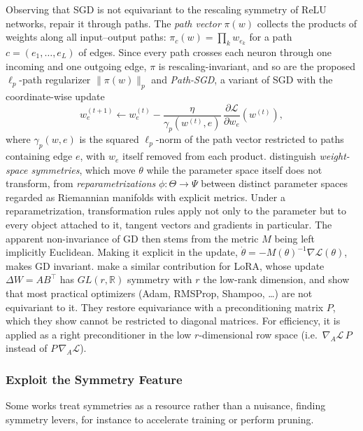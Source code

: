 \documentclass[mathematics,review,submit,moreauthors]{Definitions/mdpi}
\begin{document}
Observing that SGD is not equivariant to the rescaling symmetry of ReLU networks, \citet{neyshabur2015anips} repair it through paths.
The \emph{path vector} $\pi(w)$ collects the products of weights along all input--output paths: $\pi_c(w)=\prod_{k}w_{e_k}$ for a path $c=(e_1,\dots,e_L)$ of edges.
Since every path crosses each neuron through one incoming and one outgoing edge, $\pi$ is rescaling-invariant, and so are the proposed $\ell_p$-path regularizer $\lVert\pi(w)\rVert_p$ and \emph{Path-SGD}, a variant of SGD with the coordinate-wise update
\begin{equation*}
    w_e^{(t+1)}\gets w_e^{(t)}-\frac{\eta}{\gamma_p(w^{(t)},e)}\,\frac{\partial\mathcal{L}}{\partial w_e}(w^{(t)}),
\end{equation*}
where $\gamma_p(w,e)$ is the squared $\ell_p$-norm of the path vector restricted to paths containing edge $e$, with $w_e$ itself removed from each product.
\citet{kristiadi2023anips} distinguish \emph{weight-space symmetries}, which move $\theta$ while the parameter space itself does not transform, from \emph{reparametrizations} $\phi:\Theta\to\Psi$ between distinct parameter spaces regarded as Riemannian manifolds with explicit metrics.
Under a reparametrization, transformation rules apply not only to the parameter but to every object attached to it, tangent vectors and gradients in particular.
The apparent non-invariance of GD then stems from the metric $M$ being left implicitly Euclidean.
Making it explicit in the update, $\dot{\theta}=-M(\theta)^{-1}\nabla\mathcal{L}(\theta)$, makes GD invariant.
\citet{yen2025iclr} make a similar contribution for LoRA, whose update $\Delta W=AB^{\top}$ has $GL(r,\mathbb{R})$ symmetry with $r$ the low-rank dimension, and show that most practical optimizers (Adam, RMSProp, Shampoo, \dots) are not equivariant to it.
They restore equivariance with a preconditioning matrix $P$, which they show cannot be restricted to diagonal matrices.
For efficiency, it is applied as a right preconditioner in the low $r$-dimensional row space (i.e.\ $\nabla_A\mathcal{L}\,P$ instead of $P\,\nabla_A\mathcal{L}$).

\subsubsection{Exploit the Symmetry Feature}\label{sec:exploit-symmetry-feature}
Some works treat symmetries as a resource rather than a nuisance, finding symmetry levers, for instance to accelerate training or perform pruning.
\end{document}
